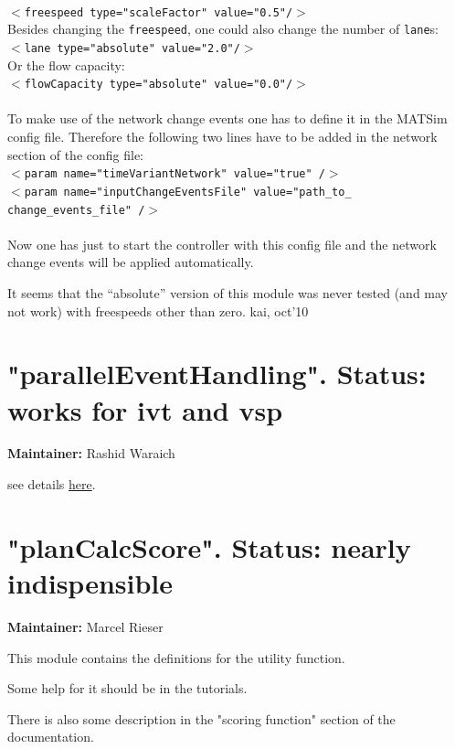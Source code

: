 \\   
\texttt{$<$freespeed type="scaleFactor" value="0.5"/$>$}
\\  Besides changing the 
\texttt{freespeed}, one could also change the number of 
\texttt{lane}s:
\\   
\texttt{$<$lane type="absolute" value="2.0"/$>$}
\\  Or the flow capacity:
\\   
\texttt{$<$flowCapacity type="absolute" value="0.0"/$>$}
\\
\\  To make use of the network change events one has to define it in the  MATSim config file. Therefore the following two lines have to be added  in the network section of the config file:
\\
\texttt{$<$param name="timeVariantNetwork" value="true" /$>$
\\  $<$param name="inputChangeEventsFile" value="path\_to\_ change\_events\_file" /$>$}
\\
\\  Now one has just to start the controller with this config file and the network change events will be applied automatically.

It  seems that the ``absolute'' version of this module was never tested (and  may not work) with freespeeds other than zero. kai, oct'10



\vfill\eject
\section{"parallelEventHandling". Status: works for ivt and vsp}

\textbf{Maintainer:} Rashid Waraich

see details \href{http://matsim.org/node/238}{here}.



\vfill\eject
\section{"planCalcScore". Status: nearly indispensible}

\textbf{Maintainer:} Marcel Rieser

This module contains the definitions for the utility function.

Some help for it should be in the tutorials.

There is also some description in the "scoring function" section of the documentation.

